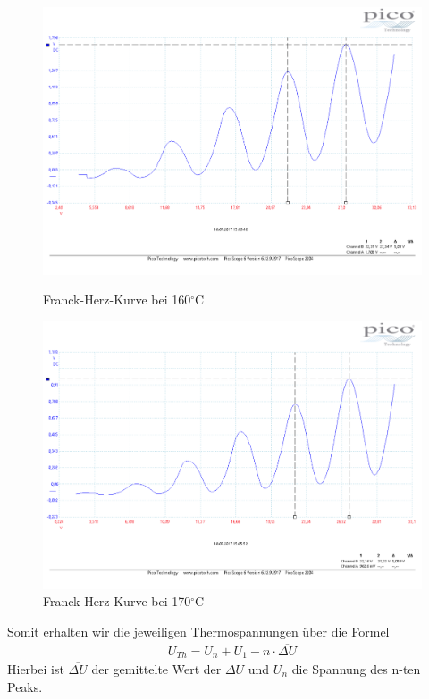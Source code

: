 \begin{figure}
	\includegraphics[width=\textwidth]{../Daten/Aufgabe1/Frank_Hertz_160.pdf}
	\caption{Franck-Herz-Kurve bei 160$ ^\circ $C}
	\includegraphics[width=\textwidth]{../Daten/Aufgabe1/Frank_Hertz_170.pdf}
	\caption{Franck-Herz-Kurve bei 170$ ^\circ $C}
\end{figure}
Somit erhalten wir die jeweiligen Thermospannungen über die Formel
\begin{align*}
U_{Th}=U_{n}+U_{1}-n\cdot \overline{\Delta U}
\end{align*}
Hierbei ist $ \overline{\Delta U} $ der gemittelte Wert der $ \Delta U $ und $ U_{n} $ die Spannung des n-ten Peaks.

